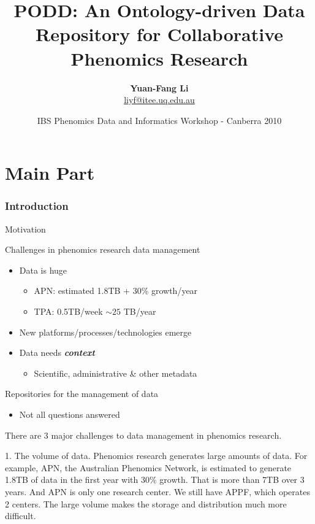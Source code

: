 \documentclass[ignorenonframetext,compress]{beamer}
\title[PODD -- Ontology-driven Repository]{PODD: An Ontology-driven Data Repository for Collaborative Phenomics Research}
\author[Yuan-Fang Li]{
    \textbf{Yuan-Fang Li}\\
    \url{liyf@itee.uq.edu.au}
    }
\institute[UQ]{
    The eResearch Lab, School of ITEE\\The University of Queensland\\
    }
\date[IBS Workshop 2010]{\footnotesize IBS Phenomics Data and Informatics Workshop - Canberra 2010}
\begin{document}
\begin{frame}
    \titlepage
\end{frame}

\part{Main Part}

\section{Introduction}
\begin{frame}{Motivation}
\begin{block}{Challenges in phenomics research data management}
    \begin{itemize}
        \item Data is huge
        \begin{itemize}
            \item APN: estimated 1.8TB + 30\% growth/year
            \item TPA: 0.5TB/week $\sim 25$ TB/year
        \end{itemize}
        \pause
        \item New platforms/processes/technologies emerge
        \pause
        \item Data needs \textbf{\emph{context}}
        \begin{itemize}
            \item Scientific, administrative \& other metadata
        \end{itemize}
    \end{itemize}
\end{block}
\pause
\begin{block}{Repositories for the management of data}
    \begin{itemize}
      \item Not all questions answered
    \end{itemize}
\end{block}
\end{frame}

There are 3 major challenges to data management in phenomics research.

1. The volume of data. Phenomics research generates large amounts of
data. For example, APN, the Australian Phenomics Network, is
estimated to generate 1.8TB of data in the first year with 30\%
growth. That is more than 7TB over 3 years. And APN is only one
research center. We still have APPF, which operates 2 centers. The
large volume makes the storage and distribution much more difficult.
\end{document}
